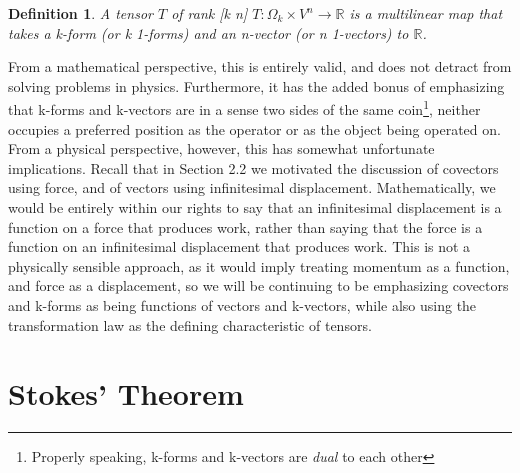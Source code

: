 \documentclass{book}
\newtheorem{defn}[equation]{Definition}
\begin{document}
\begin{defn}
	A tensor $T$ of rank [k n] $T: \Omega_k \times V^n \to \mathbb{R}$ is a multilinear map that takes a k-form (or k 1-forms) and an n-vector (or n 1-vectors) to $\mathbb{R}$. 
\end{defn}

From a mathematical perspective, this is entirely valid, and does not detract from solving problems in physics. Furthermore, it has the added bonus of emphasizing that k-forms and k-vectors are in a sense two sides of the same coin\footnote{Properly speaking, k-forms and k-vectors are \emph{dual} to each other}, neither occupies a preferred position as the operator or as the object being operated on. From a physical perspective, however, this has somewhat unfortunate implications. Recall that in Section 2.2 we motivated the discussion of covectors using force, and of vectors using infinitesimal displacement. Mathematically, we would be entirely within our rights to say that an infinitesimal displacement is a function on a force that produces work, rather than saying that the force is a function on an infinitesimal displacement that produces work. This is not a physically sensible approach, as it would imply treating momentum as a function, and force as a displacement, so we will be continuing to be emphasizing covectors and k-forms as being functions of vectors and k-vectors, while also using the transformation law as the defining characteristic of tensors.

 



\section{Stokes' Theorem}
\end{document}

